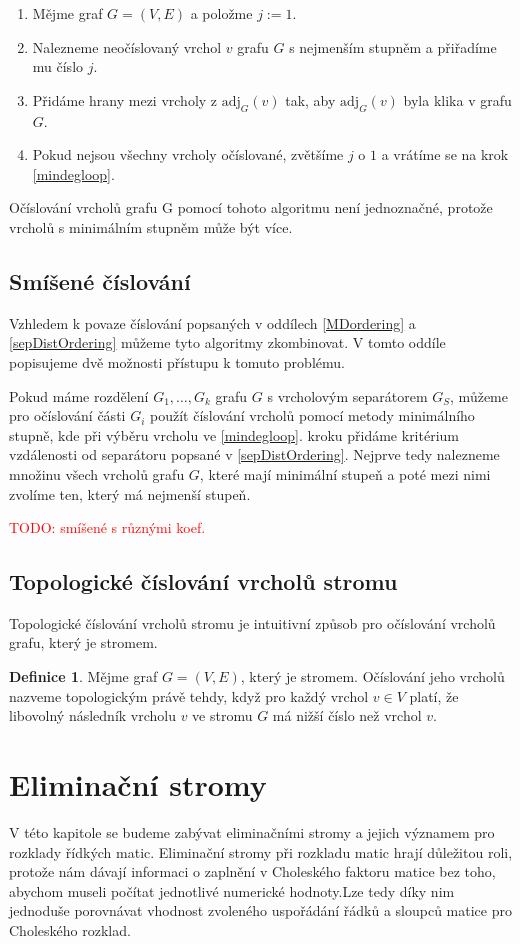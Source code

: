 \documentclass[11pt,american,czech,oneside]{book}
\theoremstyle{plain}
\theoremstyle{definition}
\newtheorem{definition}{Definice}
\newcommand{\TODO}[1]{\textcolor{red}{TODO: #1}}
\begin{document}
\begin{enumerate}
  \item Mějme graf $G=(V,E)$ a položme $j:=1$.
  \item \label{mindegloop}
      Nalezneme neočíslovaný vrchol $v$ grafu $G$ s nejmenším stupněm a přiřadíme mu číslo $j$.
  \item Přidáme hrany mezi vrcholy z $\mathrm{adj}_G(v)$ tak, aby $\mathrm{adj}_G(v)$ byla klika v grafu $G$.
  \item Pokud nejsou všechny vrcholy očíslované, zvětšíme $j$ o $1$ a vrátíme se na krok \ref{mindegloop}.
\end{enumerate}

Očíslování vrcholů grafu G pomocí tohoto algoritmu není jednoznačné, protože vrcholů s minimálním stupněm může být více.

\subsection{Smíšené číslování}
Vzhledem k povaze číslování popsaných v oddílech \ref{MDordering} a \ref{sepDistOrdering} můžeme tyto algoritmy zkombinovat. V tomto oddíle popisujeme dvě možnosti přístupu k tomuto problému.

Pokud máme rozdělení $G_1, \ldots, G_k$ grafu $G$ s vrcholovým separátorem $G_S$, můžeme pro očíslování části $G_i$ použít číslování vrcholů pomocí metody minimálního stupně, kde při výběru vrcholu ve \ref{mindegloop}. kroku přidáme kritérium vzdálenosti od separátoru popsané v \ref{sepDistOrdering}. Nejprve tedy nalezneme množinu všech vrcholů grafu $G$, které mají minimální stupeň a poté mezi nimi zvolíme ten, který má nejmenší stupeň.

\TODO{smíšené s různými koef.}

\subsection{Topologické číslování vrcholů stromu}
Topologické číslování vrcholů stromu je intuitivní způsob pro očíslování vrcholů grafu, který je stromem.
\begin{definition}
    Mějme graf $G = (V,E)$, který je stromem. Očíslování jeho vrcholů nazveme topologickým právě tehdy,
    když pro každý vrchol $v \in V$ platí, že libovolný následník vrcholu $v$ ve stromu $G$ má nižší číslo než vrchol $v$.
\end{definition}


\section{Eliminační stromy}
V této kapitole se budeme zabývat eliminačními stromy a jejich významem pro rozklady řídkých matic. Eliminační stromy při rozkladu matic hrají důležitou roli, protože nám dávají informaci o zaplnění
v Choleského faktoru matice bez toho, abychom museli počítat jednotlivé numerické hodnoty.Lze tedy díky nim jednoduše porovnávat vhodnost zvoleného uspořádání řádků a sloupců matice pro Choleského rozklad.
\end{document}
